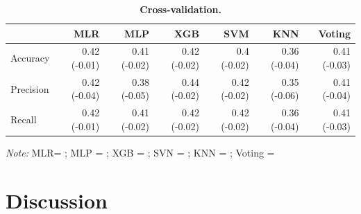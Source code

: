 \documentclass[10pt,letterpaper]{article}
\begin{document}
{{\begin{table}[!ht]
\begin{adjustwidth}{-7mm}{0in} %
\centering
\caption{\bf Cross-validation.} 
\vspace{5mm}
\begin{tabular}{|lrrrrrr|}
\hline
 & MLR & MLP & XGB & SVM & KNN & Voting\\\hline
 Accuracy &0.42 (-0.01) & 0.41 (-0.02) &0.42 (-0.02) &0.4 (-0.02) & 0.36 (-0.04) & 0.41 (-0.03)\\
 Precision & 0.42 (-0.04) & 0.38 (-0.05) & 0.44 (-0.02) & 0.42 (-0.02) & 0.35 (-0.06) & 0.41 (-0.04)\\
 Recall & 0.42 (-0.01) & 0.41 (-0.02) & 0.42 (-0.02) & 0.42 (-0.02) & 0.36 (-0.04) & 0.41 (-0.03) \\
 \hline
\end{tabular} 
\label{crossvalidation}
\end{adjustwidth}
\vspace{2mm}

\textit{Note:} MLR= ; MLP = ; XGB = ; SVN = ; KNN = ; Voting =  \\ 

\end{table}

\section*{Discussion}
}}
\end{document}
